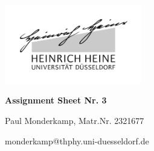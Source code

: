 \documentclass[12pt,a4paper]{article}	%
\begin{document}

\setlength{\parindent}{0pt}


\thispagestyle{empty}

\begin{titlepage}
	\centering
	\includegraphics[width=0.45\textwidth]{logo_sw.jpg}\par\vspace{1cm}
	\vspace{1cm}
	\vspace{1.5cm}
	{\LARGE\bfseries Assignment Sheet Nr. 3\\  \par}
	\vspace{1cm}
	
	{\large	Paul Monderkamp, Matr.Nr. 2321677\par}
	\vfill
	

	\vfill

	{\large  monderkamp@thphy.uni-duesseldorf.de \par}
	\vspace{2cm}
\end{titlepage}

\thispagestyle{empty} %
\newpage	%
\end{document}
